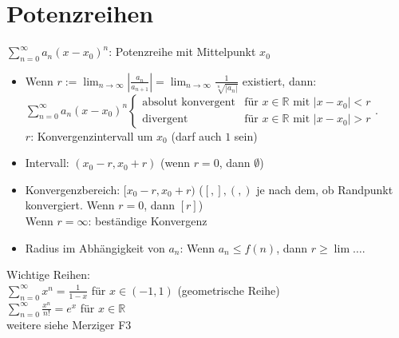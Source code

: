 \documentclass{scrreprt}
\begin{document}
\section{Potenzreihen}
$\sum_{n=0}^\infty a_n (x-x_0)^n$: Potenzreihe mit Mittelpunkt $x_0$
\begin{itemize}
\item Wenn $r:=\lim_{n\to \infty} \left| \frac{a_n}{a_{n+1}}\right|=\lim_{n\to \infty} \frac{1}{\sqrt[n]{|a_n|}}$ existiert, dann:\\
$\sum_{n=0}^\infty a_n (x-x_0)^n\begin{cases}
\text{absolut konvergent} & \text{für }x\in \mathbb{R} \text{ mit }|x-x_0|<r\\
\text{divergent} & \text{für }x\in \mathbb{R} \text{ mit }|x-x_0|>r
\end{cases}$.\\
$r$: Konvergenzintervall um $x_0$ (darf auch $1$ sein)
\item Intervall: $(x_0-r, x_0+r)$ (wenn $r=0$, dann $\emptyset$)
\item Konvergenzbereich: $[x_0-r,x_0+r)$ ($[,],(,)$ je nach dem, ob Randpunkt konvergiert. Wenn $r=0$, dann $[r]$)\\
Wenn $r=\infty$: beständige Konvergenz
\item Radius im Abhängigkeit von $a_n$: Wenn $a_n\leq f(n)$, dann $r\geq \lim \dots$.
\end{itemize}
Wichtige Reihen:\\
$\sum_{n=0}^\infty x^n = \frac{1}{1-x}$ für $x\in (-1,1)$ (geometrische Reihe)\\
$\sum_{n=0}^\infty \frac{x^n}{n!}=e^x$ für $x\in \mathbb{R}$\\
weitere siehe Merziger F3
\end{document}

